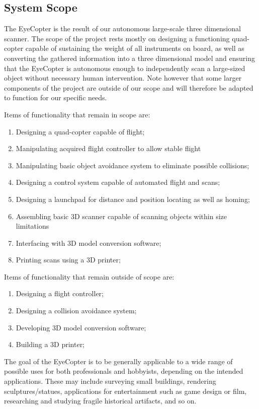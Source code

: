 \documentclass[10pt,letterpaper]{article}
\begin{document}
\subsection{System Scope}
The EyeCopter is the result of our autonomous large-scale three dimensional scanner. The scope of the project rests mostly on designing a functioning quad-copter capable of sustaining the weight of all instruments on board, as well as converting the gathered information into a three dimensional model and ensuring that the EyeCopter is autonomous enough to independently scan a large-sized object without necessary human intervention. Note however that some larger components of the project are outside of our scope and will therefore be adapted to function for our specific needs. \par 
Items of functionality that remain in scope are: 
\begin{enumerate}
	\item Designing a quad-copter capable of flight;
    \item Manipulating acquired flight controller to allow stable flight
    \item Manipulating basic object avoidance system to eliminate possible collisions;
    \item Designing a control system capable of automated flight and scans; 
    \item Designing a launchpad for distance and position locating as well as homing;
    \item Assembling basic 3D scanner capable of scanning objects within size limitations
    \item Interfacing with 3D model conversion software;
    \item Printing scans using a 3D printer;
\end{enumerate}
Items of functionality that remain outside of scope are:
\begin{enumerate}
	\item Designing a flight controller;
    \item Designing a collision avoidance system;
    \item Developing 3D model conversion software;
    \item Building a 3D printer;
\end{enumerate}
The goal of the EyeCopter is to be generally applicable to a wide range of possible uses for both professionals and hobbyists, depending on the intended applications. These may include surveying small buildings, rendering sculptures/statues, applications for entertainment such as game design or film, researching and studying fragile historical artifacts, and so on. 
\end{document}
